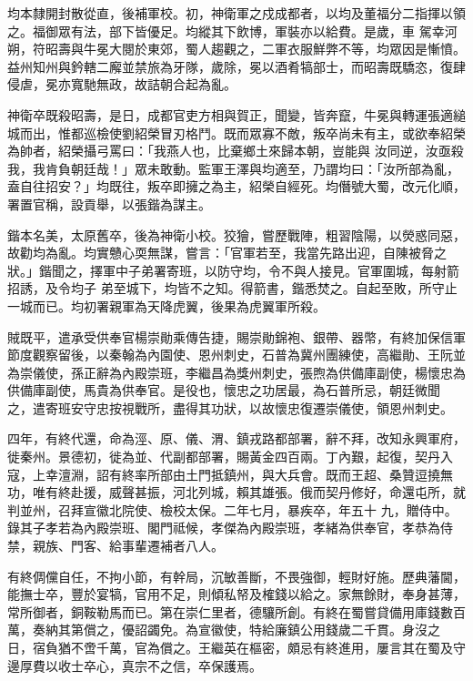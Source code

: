 \begin{pinyinscope}
 均本隸開封散從直，後補軍校。初，神衛軍之戍成都者，以均及董福分二指揮以領之。福御眾有法，部下皆優足。均縱其下飲博，軍裝亦以給費。是歲，車
 駕幸河朔，符昭壽與牛冕大閱於東郊，蜀人趨觀之，二軍衣服鮮弊不等，均眾因是慚憤。益州知州與鈐轄二廨並禁旅為牙隊，歲除，冕以酒肴犒部士，而昭壽既驕恣，復肆侵虐，冕亦寬馳無政，故詰朝合起為亂。



 神衛卒既殺昭壽，是日，成都官吏方相與賀正，聞變，皆奔竄，牛冕與轉運張適縋城而出，惟都巡檢使劉紹榮冒刃格鬥。既而眾寡不敵，叛卒尚未有主，或欲奉紹榮為帥者，紹榮攝弓罵曰：「我燕人也，比棄鄉土來歸本朝，豈能與
 汝同逆，汝亟殺我，我肯負朝廷哉！」眾未敢動。監軍王澤與均適至，乃謂均曰：「汝所部為亂，盍自往招安？」均既往，叛卒即擁之為主，紹榮自經死。均僭號大蜀，改元化順，署置官稱，設貢舉，以張鍇為謀主。



 鍇本名美，太原舊卒，後為神衛小校。狡獪，嘗歷戰陣，粗習陰陽，以熒惑同惡，故勸均為亂。均實戇心耎無謀，嘗言：「官軍若至，我當先路出迎，自陳被脅之狀。」鍇聞之，擇軍中子弟署寄班，以防守均，令不與人接見。官軍圍城，每射箭招誘，及令均子
 弟至城下，均皆不之知。得箭書，鍇悉焚之。自起至敗，所守止一城而已。均初署親軍為天降虎翼，後果為虎翼軍所殺。



 賊既平，遣承受供奉官楊崇勛乘傳告捷，賜崇勛錦袍、銀帶、器幣，有終加保信軍節度觀察留後，以秦翰為內園使、恩州刺史，石普為冀州團練使，高繼勛、王阮並為崇儀使，孫正辭為內殿崇班，李繼昌為獎州刺史，張煦為供備庫副使，楊懷忠為供備庫副使，馬貴為供奉官。是役也，懷忠之功居最，為石普所忌，朝廷微聞
 之，遣寄班安守忠按視戰所，盡得其功狀，以故懷忠復遷崇儀使，領恩州刺史。



 四年，有終代還，命為涇、原、儀、渭、鎮戎路都部署，辭不拜，改知永興軍府，徙秦州。景德初，徙為並、代副都部署，賜黃金四百兩。丁內艱，起復，契丹入寇，上幸澶淵，詔有終率所部由土門抵鎮州，與大兵會。既而王超、桑贊逗撓無功，唯有終赴援，威聲甚振，河北列城，賴其雄張。俄而契丹修好，命還屯所，就判並州，召拜宣徽北院使、檢校太保。二年七月，暴疾卒，年五十
 九，贈侍中。錄其子孝若為內殿崇班、閣門祗候，孝傑為內殿崇班，孝緒為供奉官，孝恭為侍禁，親族、門客、給事輩遷補者八人。



 有終倜儻自任，不拘小節，有幹局，沉敏善斷，不畏強御，輕財好施。歷典藩閫，能撫士卒，豐於宴犒，官用不足，則傾私帑及榷錢以給之。家無餘財，奉身甚薄，常所御者，銅鞍勒馬而已。第在崇仁里者，德驤所創。有終在蜀嘗貸備用庫錢數百萬，奏納其第償之，優詔蠲免。為宣徽使，特給廉鎮公用錢歲二千貫。身沒之
 日，宿負猶不啻千萬，官為償之。王繼英在樞密，頗忌有終進用，屢言其在蜀及守邊厚費以收士卒心，真宗不之信，卒保護焉。




\end{pinyinscope}
